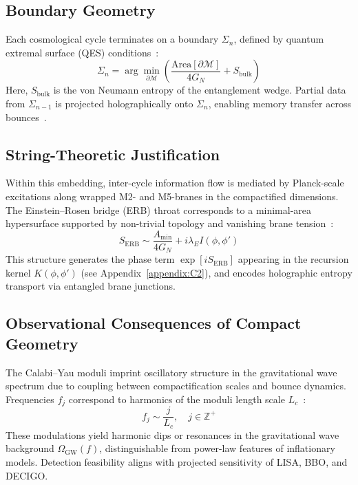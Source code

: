 \subsection*{Boundary Geometry}

Each cosmological cycle terminates on a boundary \( \Sigma_n \), defined by quantum extremal surface (QES) conditions~\cite{engelhardt2015coarse}:
\[
\Sigma_n = \arg\min_{\partial \mathcal{M}} \left( \frac{\mathrm{Area}[\partial \mathcal{M}]}{4G_N} + S_{\text{bulk}} \right)
\]
Here, \( S_{\text{bulk}} \) is the von Neumann entropy of the entanglement wedge. Partial data from \( \Sigma_{n-1} \) is projected holographically onto \( \Sigma_n \), enabling memory transfer across bounces~\cite{almheiri2019entropy}.

\subsection*{String-Theoretic Justification}

Within this embedding, inter-cycle information flow is mediated by Planck-scale excitations along wrapped M2- and M5-branes in the compactified dimensions. The Einstein–Rosen bridge (ERB) throat corresponds to a minimal-area hypersurface supported by non-trivial topology and vanishing brane tension~\cite{maldacena2013cool}:
\[
S_{\text{ERB}} \sim \frac{A_{\text{min}}}{4G_N} + i \lambda_E I(\phi, \phi')
\]
This structure generates the phase term \( \exp[i S_{\text{ERB}}] \) appearing in the recursion kernel \( K(\phi, \phi') \) (see Appendix~\ref{appendix:C2}), and encodes holographic entropy transport via entangled brane junctions.

\subsection*{Observational Consequences of Compact Geometry}

The Calabi–Yau moduli imprint oscillatory structure in the gravitational wave spectrum due to coupling between compactification scales and bounce dynamics. Frequencies \( f_j \) correspond to harmonics of the moduli length scale \( L_c \)~\cite{dienes1997string}:
\[
f_j \sim \frac{j}{L_c}, \quad j \in \mathbb{Z}^+
\]
These modulations yield harmonic dips or resonances in the gravitational wave background \( \Omega_{\text{GW}}(f) \), distinguishable from power-law features of inflationary models. Detection feasibility aligns with projected sensitivity of LISA, BBO, and DECIGO.

